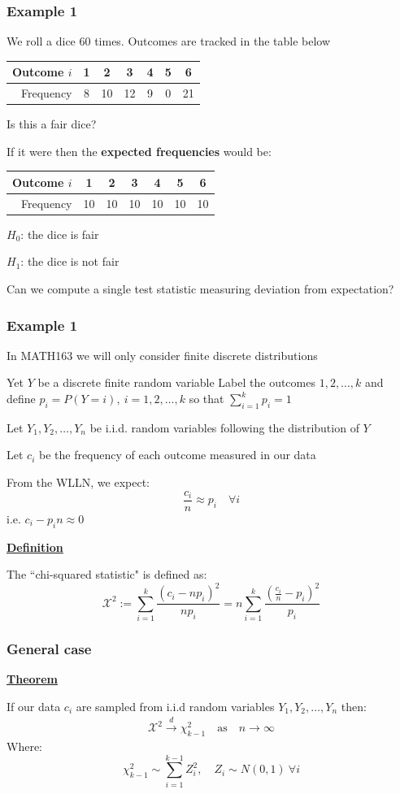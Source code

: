 \documentclass[t,8pt]{beamer}%
\begin{document}
\begin{frame}
	\frametitle{Example 1}
    We roll a dice 60 times. Outcomes are tracked in the table below
\begin{center}
    \begin{tabular}{r|cccccc}
        Outcome $i$ & 1 & 2 & 3 & 4 & 5 & 6 \\ \hline
        Frequency & 8 & 10 & 12 & 9 & 0 & 21 \\
    \end{tabular}
\end{center}
Is this a fair dice? \par
If it were then the {\bf expected frequencies} would be:
\begin{center}
    \begin{tabular}{r|cccccc}
        Outcome $i$ & 1 & 2 & 3 & 4 & 5 & 6 \\ \hline
        Frequency & 10 & 10 & 10 & 10 & 10 & 10 \\
    \end{tabular}
\end{center}
$H_0$: the dice is fair \par
$H_1$: the dice is not fair \par
Can we compute a single test statistic measuring deviation from expectation?
\end{frame}

\begin{frame}
	\frametitle{Example 1}
    In MATH163 we will only consider finite discrete distributions \par
    Yet $Y$ be a discrete finite random variable
    Label the outcomes $1,2,\dots,k$ and define $p_i=P(Y=i),\ i=1,2,\dots,k$ so that $\sum_{i=1}^kp_i=1$ \par
    Let $Y_1,Y_2,\dots,Y_n$ be i.i.d. random variables following the distribution of $Y$ \par
    Let $c_i$ be the frequency of each outcome measured in our data \par
    From the WLLN, we expect:
    $$\frac {c_i}n\approx p_i\quad\forall i$$
    i.e. $c_i-p_in\approx 0$ \par
    {\bf\underline{Definition}} \par
    The ``chi-squared statistic" is defined as:
    $$\mathcal{X}^2:=\sum_{i=1}^k\frac{(c_i-np_i)^2}{np_i}=n\sum_{i=1}^k\frac{\left(\frac{c_i}n-p_i\right)^2}{p_i}$$
\end{frame}

\begin{frame}
	\frametitle{General case}
    {\bf\underline{Theorem}} \par
    If our data $c_i$ are sampled from i.i.d random variables $Y_1,Y_2,\dots,Y_n$ then:
    \begin{eqnarray*}
        \mathcal{X}^2\xrightarrow{d}\chi^2_{k-1}\quad\text{as}\quad n\rightarrow\infty
    \end{eqnarray*}
    Where:
    $$\chi^2_{k-1}\sim\sum_{i=1}^{k-1}Z_i^2,\quad Z_i\sim N(0,1)\ \forall i$$
\end{frame}
\end{document}
